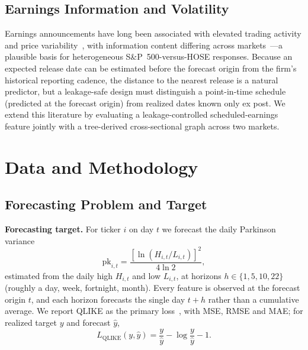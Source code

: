 \documentclass[runningheads,a4paper]{llncs}
\begin{document}
\subsection{Earnings Information and Volatility}
Earnings announcements have long been associated with elevated trading activity and price
variability~\cite{beaver1968,patell1981}, with information content differing across
markets~\cite{defond2007}---a plausible basis for heterogeneous S\&P~500-versus-HOSE responses. Because an
expected release date can be estimated before the forecast origin from the firm's historical reporting
cadence, the distance to the nearest release is a natural predictor, but a leakage-safe design must
distinguish a point-in-time schedule (predicted at the forecast origin) from realized dates known only ex
post. We extend this literature by evaluating a leakage-controlled
scheduled-earnings feature jointly with a tree-derived cross-sectional graph across two markets.


\section{Data and Methodology}

\subsection{Forecasting Problem and Target}
\indent\textbf{Forecasting target.} For ticker $i$ on day $t$ we forecast the daily Parkinson variance
\[ \mathrm{pk}_{i,t}=\frac{[\ln(H_{i,t}/L_{i,t})]^2}{4\ln 2}, \]
estimated from the daily high $H_{i,t}$ and low $L_{i,t}$, at horizons $h\in\{1,5,10,22\}$ (roughly a day,
week, fortnight, month). Every feature is observed at the forecast origin $t$, and each horizon forecasts
the single day $t+h$ rather than a cumulative average. We report QLIKE as the primary
loss~\cite{patton2011}, with MSE, RMSE and MAE; for realized target $y$ and forecast $\hat y$,
\[ L_{\mathrm{QLIKE}}(y,\hat y)=\frac{y}{\hat y}-\log\frac{y}{\hat y}-1. \]
\end{document}
